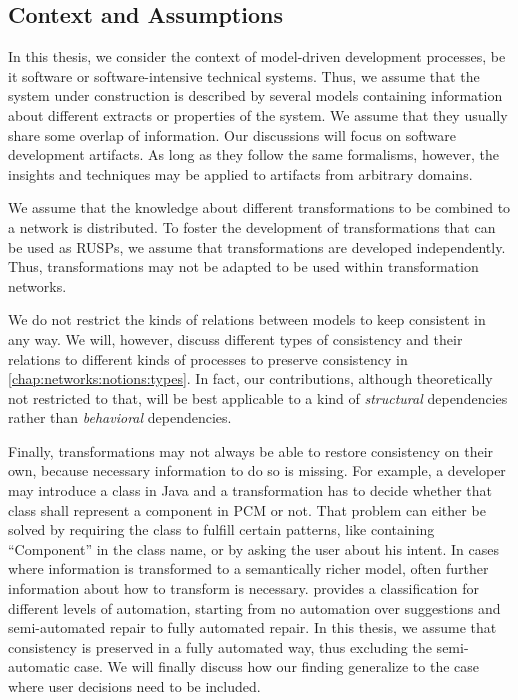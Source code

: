 \subsection{Context and Assumptions}
\label{chap:introduction:objective:assumptions}

In this thesis, we consider the context of model-driven development processes, be it software or software-intensive technical systems.
Thus, we assume that the system under construction is described by several models containing information about different extracts or properties of the system.
We assume that they usually share some overlap of information.
Our discussions will focus on software development artifacts.
As long as they follow the same formalisms, however, the insights and techniques may be applied to artifacts from arbitrary domains.

We assume that the knowledge about different transformations to be combined to a network is distributed.
To foster the development of transformations that can be used as \glspl{RUSP}, we assume that transformations are developed independently.
Thus, transformations may not be adapted to be used within transformation networks.

We do not restrict the kinds of relations between models to keep consistent  in any way.
We will, however, discuss different types of consistency and their relations to different kinds of processes to preserve consistency in \autoref{chap:networks:notions:types}.
In fact, our contributions, although theoretically not restricted to that, will be best applicable to a kind of \emph{structural} dependencies rather than \emph{behavioral} dependencies.

Finally, transformations may not always be able to restore consistency on their own, because necessary information to do so is missing.
For example, a developer may introduce a class in Java and a transformation has to decide whether that class shall represent a component in \gls{PCM} or not.
That problem can either be solved by requiring the class to fulfill certain patterns, like containing \enquote{Component} in the class name, or by asking the user about his intent.
In cases where information is transformed to a semantically richer model, often further information about how to transform is necessary.
\textcite[p. 57]{kramer2017a} provides a classification for different levels of automation, starting from no automation over suggestions and semi-automated repair to fully automated repair.
In this thesis, we assume that consistency is preserved in a fully automated way, thus excluding the semi-automatic case.
We will finally discuss how our finding generalize to the case where user decisions need to be included.

